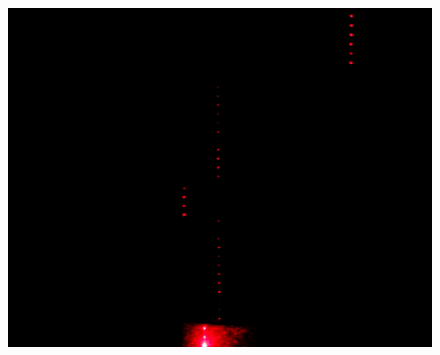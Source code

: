 \begin{figure}[ht!]
\begin{minipage}[t]{0.3\textwidth}
		\centering
		\includegraphics[width=1\textwidth]{figures/ImageAnalysis/Crop/cross2_low_light.png}
	\end{minipage}
	
	\vspace{0.02\textheight}
	

\end{figure}

